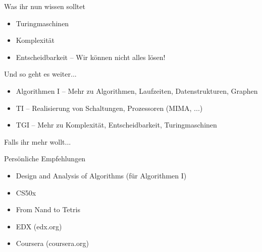 \begin{frame}	
	\begin{block}{Was ihr nun wissen solltet}
		\begin{itemize}
			\item Turingmaschinen
			\item Komplexität
			\item Entscheidbarkeit -- Wir können nicht alles lösen!
		\end{itemize}
	\end{block}
	
	\begin{block}{Und so geht es weiter...}
		\begin{itemize}
			\item Algorithmen I -- Mehr zu Algorithmen, Laufzeiten, Datenstrukturen, Graphen
			\item TI -- Realisierung von Schaltungen, Prozessoren (MIMA, ...)
			\item TGI -- Mehr zu Komplexität, Entscheidbarkeit, Turingmaschinen
		\end{itemize}
	\end{block}
\end{frame}

\begin{frame}{Falls ihr mehr wollt...}
	\begin{block}{Persönliche Empfehlungen}
		\begin{itemize}
			\item Design and Analysis of Algorithms (für Algorithmen I)
			\item CS50x
			\item From Nand to Tetris
		\end{itemize}
	\end{block}

	\begin{itemize}
		\item EDX (edx.org)
		\item Coursera (coursera.org)
	\end{itemize}
\end{frame}

